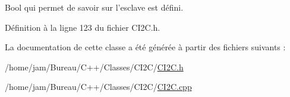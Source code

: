 Bool qui permet de savoir sur l'esclave est défini. 



Définition à la ligne 123 du fichier C\+I2\+C.\+h.



La documentation de cette classe a été générée à partir des fichiers suivants \+:\begin{DoxyCompactItemize}
\item 
/home/jam/\+Bureau/\+C++/\+Classes/\+C\+I2\+C/\hyperlink{_c_i2_c_8h}{C\+I2\+C.\+h}\item 
/home/jam/\+Bureau/\+C++/\+Classes/\+C\+I2\+C/\hyperlink{_c_i2_c_8cpp}{C\+I2\+C.\+cpp}\end{DoxyCompactItemize}
